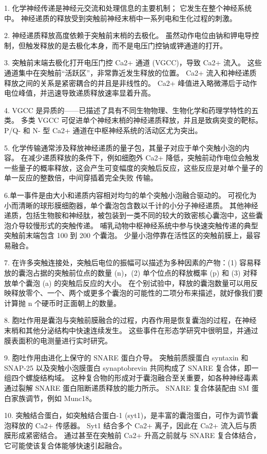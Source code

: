 1. 化学神经传递是神经元交流和处理信息的主要机制； 它发生在整个神经系统中。 神经递质的释放受到突触前神经末梢中一系列电和生化过程的刺激。 

2. 神经递质释放高度依赖于突触前末梢的去极化。 虽然动作电位由钠和钾电导控制，但触发释放的是去极化本身，而不是电压门控钠或钾通道的打开。 

3. 突触前末端去极化打开电压门控 Ca2+ 通道 (VGCC)，导致 Ca2+ 流入。 这些通道集中在突触前“活跃区”，非常靠近发生释放的位置。 Ca2+ 流入和神经递质释放之间的关系是紧密耦合的并且是非线性的。 Ca2+ 峰值进入略微滞后于动作电位峰值，并迅速导致递质释放速率显着升高。 

4. VGCC 是异质的——已描述了具有不同生物物理、生物化学和药理学特性的五类。 多类 VGCC 可促进单个神经末梢的神经递质释放，并且是致病突变的靶标。 P/Q- 和 N- 型 Ca2+ 通道在中枢神经系统的活动区尤为突出。 

5. 化学传输通常涉及释放神经递质的量子包，其量子对应于单个突触小泡的内容。 在减少递质释放的条件下，例如细胞外 Ca2+ 降低，突触前动作电位会触发一些量子的概率释放，这会产生可变幅度的突触后反应，这些反应是对单个量子的单一反应的整数倍，中间穿插着完全失败 传输。 

6.单一事件是由大小和递质内容相对均匀的单个突触小泡融合驱动的。 可视化为小而清晰的球形膜细胞器，单个囊泡包含数以千计的小分子神经递质。 其他神经递质，包括生物胺和神经肽，被包装到一类不同的较大的致密核心囊泡中，这些囊泡介导较慢形式的突触传递。 哺乳动物中枢神经系统中参与快速突触传递的典型突触前末端包含 100 到 200 个囊泡。 少量小泡停靠在活性区的突触前膜上，最容易融合。

7. 在许多突触连接处，突触后电位的振幅可以描述为多种因素的产物：(1) 容易释放的囊泡占据的突触前位点的数量 (n)，(2) 单个位点的释放概率 (p) 和 (3) 对释放单个囊泡 (a) 的突触后反应的大小。 在个别试验中，释放的囊泡数量可以用反映释放零个、一个、两个或更多个囊泡的可能性的二项分布来描述，就好像我们要计算抛 n 个硬币时正面朝上的数量。 

8. 胞吐作用是囊泡与突触前膜融合的过程，内吞作用是恢复囊泡的过程，在神经末梢和其他分泌结构中快速连续发生。 这些事件在形态学研究中很明显，并通过膜表面积的电测量进行实时研究。 

9. 胞吐作用由进化上保守的 SNARE 蛋白介导。 突触前质膜蛋白 syntaxin 和 SNAP-25 以及突触小泡膜蛋白 synaptobrevin 共同构成了 SNARE 复合体，即一组四个螺旋结构域。 这种复合物的形成对于囊泡融合至关重要，如各种神经毒素通过裂解 SNARE 蛋白阻断递质释放的能力所示。 SNARE 复合体装配由 SM 蛋白家族调节，例如 Munc18。 

10. 突触结合蛋白，如突触结合蛋白-1 (syt1)，是丰富的囊泡蛋白，可作为调节囊泡释放的 Ca2+ 传感器。 Syt1 结合多个 Ca2+ 离子，因此在 Ca2+ 流入后与质膜形成紧密结合。 通过甚至在突触前 Ca2+ 升高之前就与 SNARE 复合体结合，它可能使该复合体能够快速引起融合。 

